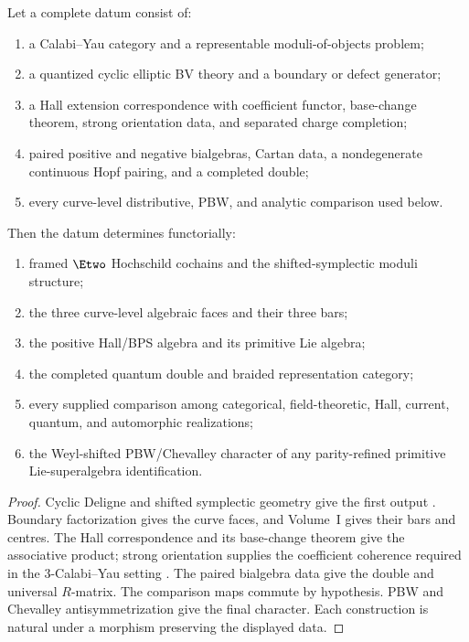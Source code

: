 \begin{theorem}
Let a complete datum consist of:
\begin{enumerate}
\item a Calabi--Yau category and a representable moduli-of-objects problem;
\item a quantized cyclic elliptic BV theory and a boundary or defect generator;
\item a Hall extension correspondence with coefficient functor, base-change theorem, strong orientation data, and separated charge completion;
\item paired positive and negative bialgebras, Cartan data, a nondegenerate continuous Hopf pairing, and a completed double;
\item every curve-level distributive, PBW, and analytic comparison used below.
\end{enumerate}
Then the datum determines functorially:
\begin{enumerate}
\item framed $\Etwo$ Hochschild cochains and the shifted-symplectic moduli structure;
\item the three curve-level algebraic faces and their three bars;
\item the positive Hall/BPS algebra and its primitive Lie algebra;
\item the completed quantum double and braided representation category;
\item every supplied comparison among categorical, field-theoretic, Hall, current, quantum, and automorphic realizations;
\item the Weyl-shifted PBW/Chevalley character of any parity-refined primitive Lie-superalgebra identification.
\end{enumerate}
\end{theorem}
\begin{proof}
Cyclic Deligne and shifted symplectic geometry give the first output \cite{BravRozenblyum,PTVV,BravDyckerhoff}.  Boundary factorization gives the curve faces, and Volume~I gives their bars and centres.  The Hall correspondence and its base-change theorem give the associative product; strong orientation supplies the coefficient coherence required in the $3$-Calabi--Yau setting \cite{KPS}.  The paired bialgebra data give the double and universal $R$-matrix.  The comparison maps commute by hypothesis.  PBW and Chevalley antisymmetrization give the final character.  Each construction is natural under a morphism preserving the displayed data.
\end{proof}

